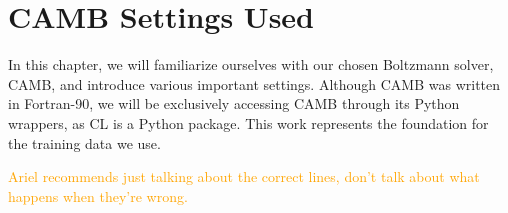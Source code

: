 \chapter{CAMB Settings Used}
\label{chap: CAMB_setup}

In this chapter, we will familiarize ourselves with our chosen Boltzmann 
solver, CAMB, and introduce various important settings. Although CAMB was
written in Fortran-90, we will be exclusively accessing CAMB through its
Python wrappers, as CL is a Python package. This work represents the 
foundation for the training data we use.

\begin{comment}
\textcolor{blue}{
I hope to, in painstaking detail, cover many of the lines of the code that I
have written to interface with CAMB. I will include plots to indicate, at
every step, what incorrect settings cause the power spectrum to look like (or,
for subtler errors, what the error curves looked like compared to Ariel's
results, which I treated as a sort of ``ground truth''). This should also be a
good example to flex my physics interpretation skills: why does this incorrect
setting produce this undesired pattern?}

\textcolor{blue}{You might think that this is sort of an inappropriate 
section
for a master's thesis (especially since I have in mind that this be a lengthy 
section), but I would like to include it unless you feel very strongly. After
all, I spent several months of the project debugging at least ten different 
ways that slight and major errors in the various settings led to 
irreconcilable results.}
\end{comment}

\textcolor{orange}{Ariel recommends
just talking about the correct lines, don't talk about what happens when
they're wrong.}

\begin{comment}
In figure \ref{fig: spectrum_type}, we can see that requesting of the wrong
power spectrum type can in some low-$\omega_\nu$ cases yields errors so low
that we might accidentally overlook them. This error pattern is easily
recognizable and is a consequence of the definition of the power spectrum: the
Fourier transform  of the two-point correlation function. ...Okay, I'm still 
thinking about this. I don't understand %
\end{comment}

